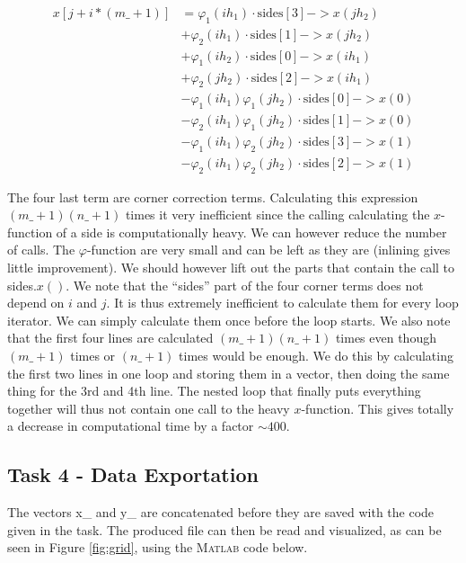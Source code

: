 \documentclass[paper=a4, fontsize=12pt]{article} %
\begin{document}
\begin{align*}
x[j+i*(m\_+1)]  &= \varphi_1(ih_1)\cdot \textrm{sides}[3]->x(jh_2) \\
	&+ \varphi_2(ih_1)\cdot \textrm{sides}[1]->x(jh_2) \\
	&+ \varphi_1(ih_2)\cdot \textrm{sides}[0]->x(ih_1) \\
	&+ \varphi_2(jh_2)\cdot \textrm{sides}[2]->x(ih_1) \\
	&- \varphi_1(ih_1) \varphi_1(jh_2) \cdot  \textrm{sides}[0]->x(0) \\
	&- \varphi_2(ih_1) \varphi_1(jh_2) \cdot  \textrm{sides}[1]->x(0) \\
	&- \varphi_1(ih_1) \varphi_2(jh_2) \cdot  \textrm{sides}[3]->x(1) \\
	&- \varphi_2(ih_1) \varphi_2(jh_2) \cdot  \textrm{sides}[2]->x(1)
\end{align*}


The four last term are corner correction terms. Calculating this expression $(m\_+1)(n\_+1)$ times it very inefficient since the calling calculating the $x$-function of a side is computationally heavy. We can however reduce the number of calls. The $\varphi$-function are very small and can be left as they are (inlining gives little improvement). We should however lift out the parts that contain the call to sides.$x()$. We note that the ``sides'' part of the four corner terms does not depend on $i$ and $j$. It is thus extremely inefficient to calculate them for every loop iterator. We can simply calculate them once before the loop starts. We also note that the first four lines are calculated $(m\_+1)(n\_+1)$ times even though $(m\_+1)$ times or $(n\_+1)$ times would be enough. We do this by calculating the first two lines in one loop and storing them in a vector, then doing the same thing for the 3rd and 4th line. The nested loop that finally puts everything together will thus not contain one call to the heavy $x$-function. This gives totally a decrease in computational time by a factor $\sim 400$.\\

\subsection*{Task 4 - Data Exportation}

The vectors x\_ and y\_ are concatenated before they are saved with
the code given in the task. The produced file can then be read and
visualized, as can be seen in Figure \ref{fig:grid}, using
the \textsc{Matlab} code below.
\end{document}
